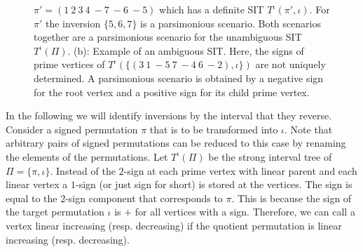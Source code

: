 \documentclass{svmult}
\newcommand{\MB}[2]{{\textcolor{gray}{#1}}\textcolor{blue}{#2}}
\newcommand{\m}[1]{\mathcal{#1}}
\begin{document}
\begin{figure}
{	$\pi'=(1~2~3~4~-{7}~-{6}~-{5})$
	which has a definite SIT ${T}^\iota(\pi',\iota)$. For $\pi'$ the 
	inversion $\{5,6,7\}$ is a parsimonious
	scenario.
	Both scenarios together are a parsimonious scenario for the unambiguous SIT ${T}^\iota(\Pi)$.
	(b): Example of an ambiguous SIT. Here, the signs of
	prime vertices of ${T}^\iota(\{(3~1~-{5}~7~-{4}~6~-{2}),\iota\})$ are not
	uniquely determined.
	A parsimonious scenario is obtained by a negative sign
	for the root vertex and a positive sign for its child prime vertex.}
	\label{fig:SIT_un_ambiguous}
\end{figure}


In the following we will identify inversions by the interval that they reverse. 
Consider a signed permutation $\pi$ that is to be transformed into $\iota$. 
Note that arbitrary pairs of signed permutations can be reduced to this case 
by renaming the elements of the permutations. 
Let ${T}^\iota(\Pi)$ be the strong interval tree of $\Pi=\{\pi,\iota\}$.
Instead of the $2$-sign at each prime vertex with linear parent and each linear
vertex a $1$-sign (or just sign for short) is stored at the vertices. The 
sign is equal to the $2$-sign component that corresponds to $\pi$. 
This is because the sign of the target permutation $\iota$ is $+$ for all vertices 
with a sign. 
Therefore, we can call a vertex linear increasing (resp. decreasing) if 
the quotient permutation is linear increasing (resp. decreasing). 
\end{document}
